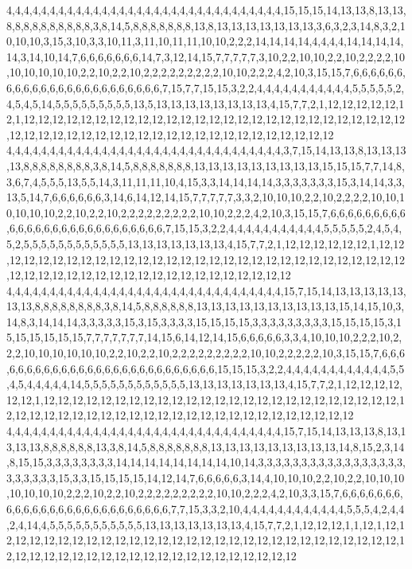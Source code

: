 4,4,4,4,4,4,4,4,4,4,4,4,4,4,4,4,4,4,4,4,4,4,4,4,4,4,4,4,4,4,4,4,15,15,15,14,13,13,8,13,13,8,8,8,8,8,8,8,8,8,8,3,8,14,5,8,8,8,8,8,8,8,13,8,13,13,13,13,13,13,13,3,6,3,2,3,14,8,3,2,10,10,10,3,15,3,10,3,3,10,11,3,11,10,11,11,10,10,2,2,2,14,14,14,14,4,4,4,4,14,14,14,14,14,3,14,10,14,7,6,6,6,6,6,6,6,14,7,3,12,14,15,7,7,7,7,7,3,10,2,2,10,10,2,2,10,2,2,2,2,10,10,10,10,10,10,2,2,10,2,2,10,2,2,2,2,2,2,2,2,2,10,10,2,2,2,4,2,10,3,15,15,7,6,6,6,6,6,6,6,6,6,6,6,6,6,6,6,6,6,6,6,6,6,6,6,6,7,15,7,7,15,15,3,2,2,4,4,4,4,4,4,4,4,4,4,4,5,5,5,5,5,2,4,5,4,5,14,5,5,5,5,5,5,5,5,5,13,5,13,13,13,13,13,13,13,13,4,15,7,7,2,1,12,12,12,12,12,12,1,12,12,12,12,12,12,12,12,12,12,12,12,12,12,12,12,12,12,12,12,12,12,12,12,12,12,12,12,12,12,12,12,12,12,12,12,12,12,12,12,12,12,12,12,12,12,12,12,12,12
4,4,4,4,4,4,4,4,4,4,4,4,4,4,4,4,4,4,4,4,4,4,4,4,4,4,4,4,4,4,4,4,3,7,15,14,13,13,8,13,13,13,13,8,8,8,8,8,8,8,8,3,8,14,5,8,8,8,8,8,8,8,13,13,13,13,13,13,13,13,13,15,15,15,7,7,14,8,3,6,7,4,5,5,5,13,5,5,14,3,11,11,11,10,4,15,3,3,14,14,14,14,3,3,3,3,3,3,3,15,3,14,14,3,3,13,5,14,7,6,6,6,6,6,6,3,14,6,14,12,14,15,7,7,7,7,7,3,3,2,10,10,10,2,2,10,2,2,2,2,10,10,10,10,10,10,2,2,10,2,2,10,2,2,2,2,2,2,2,2,2,10,10,2,2,2,4,2,10,3,15,15,7,6,6,6,6,6,6,6,6,6,6,6,6,6,6,6,6,6,6,6,6,6,6,6,6,6,6,6,7,15,15,3,2,2,4,4,4,4,4,4,4,4,4,4,4,5,5,5,5,5,2,4,5,4,5,2,5,5,5,5,5,5,5,5,5,5,5,5,13,13,13,13,13,13,13,4,15,7,7,2,1,12,12,12,12,12,12,1,12,12,12,12,12,12,12,12,12,12,12,12,12,12,12,12,12,12,12,12,12,12,12,12,12,12,12,12,12,12,12,12,12,12,12,12,12,12,12,12,12,12,12,12,12,12,12,12,12,12
4,4,4,4,4,4,4,4,4,4,4,4,4,4,4,4,4,4,4,4,4,4,4,4,4,4,4,4,4,4,4,4,15,7,15,14,13,13,13,13,13,13,13,8,8,8,8,8,8,8,8,3,8,14,5,8,8,8,8,8,8,13,13,13,13,13,13,13,13,13,13,15,14,15,10,3,14,8,3,14,14,14,3,3,3,3,3,15,3,15,3,3,3,3,15,15,15,15,3,3,3,3,3,3,3,3,3,15,15,15,15,3,15,15,15,15,15,15,7,7,7,7,7,7,7,14,15,6,14,12,14,15,6,6,6,6,6,3,3,4,10,10,10,2,2,2,10,2,2,2,10,10,10,10,10,10,2,2,10,2,2,10,2,2,2,2,2,2,2,2,2,10,10,2,2,2,2,2,10,3,15,15,7,6,6,6,6,6,6,6,6,6,6,6,6,6,6,6,6,6,6,6,6,6,6,6,6,6,6,6,15,15,15,3,2,2,4,4,4,4,4,4,4,4,4,4,4,4,5,5,4,5,4,4,4,4,4,14,5,5,5,5,5,5,5,5,5,5,5,5,13,13,13,13,13,13,13,4,15,7,7,2,1,12,12,12,12,12,12,1,12,12,12,12,12,12,12,12,12,12,12,12,12,12,12,12,12,12,12,12,12,12,12,12,12,12,12,12,12,12,12,12,12,12,12,12,12,12,12,12,12,12,12,12,12,12,12,12,12,12
4,4,4,4,4,4,4,4,4,4,4,4,4,4,4,4,4,4,4,4,4,4,4,4,4,4,4,4,4,4,4,4,15,7,15,14,13,13,13,8,13,13,13,13,8,8,8,8,8,8,13,3,8,14,5,8,8,8,8,8,8,8,13,13,13,13,13,13,13,13,13,14,8,15,2,3,14,8,15,15,3,3,3,3,3,3,3,3,14,14,14,14,14,14,14,14,10,14,3,3,3,3,3,3,3,3,3,3,3,3,3,3,3,3,3,3,3,3,3,3,3,15,3,3,15,15,15,15,14,12,14,7,6,6,6,6,6,3,14,4,10,10,10,2,2,10,2,2,10,10,10,10,10,10,10,2,2,2,10,2,2,10,2,2,2,2,2,2,2,2,2,10,10,2,2,2,4,2,10,3,3,15,7,6,6,6,6,6,6,6,6,6,6,6,6,6,6,6,6,6,6,6,6,6,6,6,6,6,6,7,7,15,3,3,2,10,4,4,4,4,4,4,4,4,4,4,4,4,5,5,5,4,2,4,4,2,4,14,4,5,5,5,5,5,5,5,5,5,5,5,13,13,13,13,13,13,13,4,15,7,7,2,1,12,12,12,1,1,12,1,12,12,12,12,12,12,12,12,12,12,12,12,12,12,12,12,12,12,12,12,12,12,12,12,12,12,12,12,12,12,12,12,12,12,12,12,12,12,12,12,12,12,12,12,12,12,12,12,12,12
